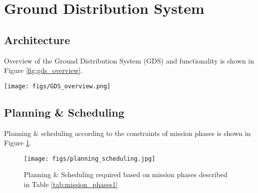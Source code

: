 \section{Ground Distribution System} \label{sec:gds}
\subsection{Architecture}
Overview of the Ground Distribution System (GDS) and \hypso functionality is shown in Figure \ref{fig:gds_overview}. 
\begin{figure*}[htbp]
	\centering
	\texttt{[image: figs/GDS\_overview.png]}
	\caption{Overview of the GDS}
	\label{fig:gds_overview}
\end{figure*}
\subsection{Planning \& Scheduling}
Planning \& scheduling according to the constraints of mission phases is shown in Figure \ref{fig:planning_scheduling}. 
\begin{figure}[htbp]
	\centering
	\texttt{[image: figs/planning\_scheduling.jpg]}
	\caption{Planning \& Scheduling required based on mission phases described in Table \ref{tab:mission_phases1}}
	\label{fig:planning_scheduling}
\end{figure}